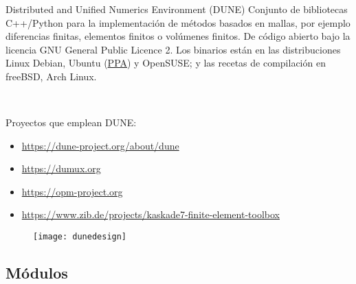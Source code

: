 \begin{frame}
	\frametitle{\secname}
	\framesubtitle{\subsecname}

	\begin{alertblock}{Distributed and Unified Numerics Environment (DUNE)}
		Conjunto de bibliotecas C++/Python para la implementación de métodos basados en mallas, por ejemplo diferencias finitas, elementos finitos o volúmenes finitos.
		De código abierto bajo la licencia GNU General Public Licence 2.
		Los binarios están en las distribuciones Linux Debian, Ubuntu (\href{https://launchpad.net/~opm/+archive/ubuntu/ppa}{PPA}) y OpenSUSE; y las recetas de compilación en freeBSD, Arch Linux.

		\

		Proyectos que emplean DUNE:
		\begin{itemize}
			\item \url{https://dune-project.org/about/dune}
			\item \url{https://dumux.org}
			\item \url{https://opm-project.org}
			\item \url{https://www.zib.de/projects/kaskade7-finite-element-toolbox}
		\end{itemize}
	\end{alertblock}

	\begin{figure}[ht!]
		\centering
		\texttt{[image: dunedesign]}
	\end{figure}

\end{frame}

\subsection{Módulos}

\begin{frame}
	\frametitle{\secname}
	\framesubtitle{\subsecname}

	\begin{columns}
		\begin{column}{0.5\textwidth}

			\

		\end{column}

		\begin{column}{0.5\textwidth}

			\

		\end{column}
	\end{columns}

\end{frame}
